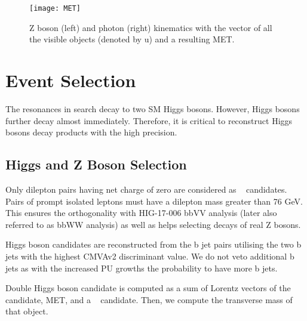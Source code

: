 \begin{figure}[H]
\centering
\texttt{[image: MET]}
\caption{ Z boson (left) and photon (right) kinematics with the vector of all the visible objects (denoted by u) and a resulting MET.}
\label{fig:MET}
\end{figure}



\section{Event Selection}
\label{sec:selection}

The resonances in search decay to two SM Higgs bosons. However, Higgs bosons further decay almost immediately. Therefore, it is critical to reconstruct Higgs bosons decay products with the high precision. 

\subsection{Higgs and Z Boson Selection}



Only dilepton pairs having net charge of zero are considered as \ZtoLL~ candidates. 
Pairs of prompt isolated leptons must have a dilepton mass greater than 76 GeV. This ensures the orthogonality with HIG-17-006 bbVV analysis (later also referred to as bbWW analysis) as well as helps selecting decays of real Z bosons.

Higgs boson candidates are reconstructed from the b jet pairs utilising the two b jets with the highest CMVAv2 discriminant value. We do not veto additional b jets as with the increased PU growths the probability to have more b jets. 

Double Higgs boson candidate is computed as a sum of Lorentz vectors of the \ZtoLL~ candidate, MET, and a \HBB~ candidate. Then, we compute the transverse mass of that object. 

